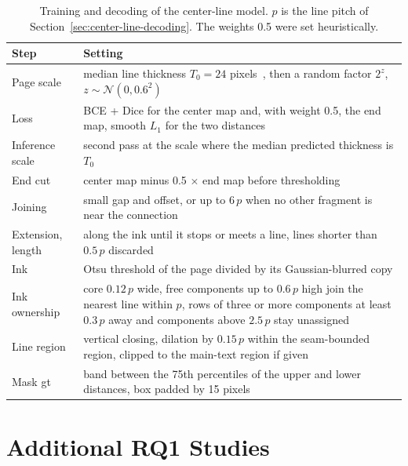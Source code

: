 \begin{table}[htbp]
    \centering
    \caption{Training and decoding of the center-line model. \(p\) is the line pitch of Section~\ref{sec:center-line-decoding}. The weights 0.5 were set heuristically.}
    \label{tab:center-line-params}
    \scriptsize
    \setlength{\tabcolsep}{3pt}
    \renewcommand{\arraystretch}{0.92}
    \begin{tabular*}{\textwidth}{@{\extracolsep{\fill}}lp{}@{}}
        \toprule
        Step & Setting \\
        \midrule
        Page scale & median line thickness \(T_0=24\) pixels~\cite{kodym2021page}, then a random factor \(2^{z}\), \(z\sim\mathcal{N}(0,0.6^2)\) \\
        Loss & BCE + Dice for the center map and, with weight 0.5, the end map, smooth \(L_1\) for the two distances \\
        Inference scale & second pass at the scale where the median predicted thickness is \(T_0\)~\cite{kodym2021page} \\
        End cut & center map minus 0.5 \(\times\) end map before thresholding \\
        Joining & small gap and offset, or up to \(6\,p\) when no other fragment is near the connection \\
        Extension, length & along the ink until it stops or meets a line, lines shorter than \(0.5\,p\) discarded \\
        Ink & Otsu threshold of the page divided by its Gaussian-blurred copy \\
        Ink ownership & core \(0.12\,p\) wide, free components up to \(0.6\,p\) high join the nearest line within \(p\), rows of three or more components at least \(0.3\,p\) away and components above \(2.5\,p\) stay unassigned \\
        Line region & vertical closing, dilation by \(0.15\,p\) within the seam-bounded region, clipped to the main-text region if given \\
        Mask \gls{gt} & band between the 75th percentiles of the upper and lower distances, box padded by 15 pixels \\
        \bottomrule
    \end{tabular*}
\end{table}


\FloatBarrier

\chapter{Additional RQ1 Studies}
\label{app:rq1-extra}

